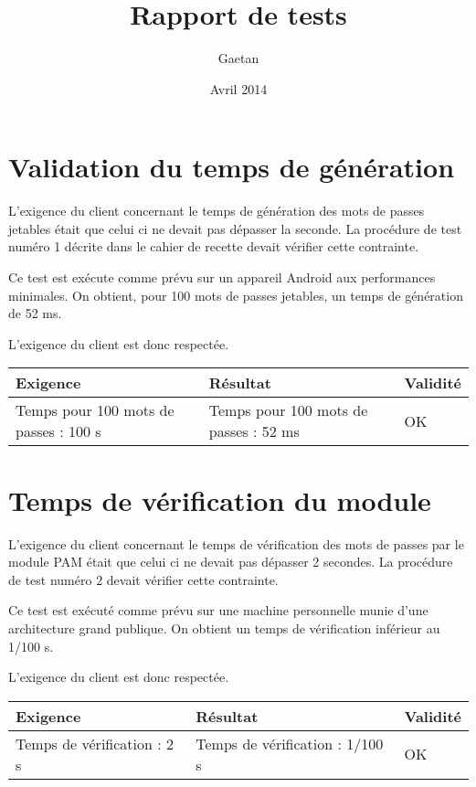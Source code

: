 \documentclass{"../../res/univ-projet"}
\title{Rapport de tests}
\author{\bsc{Ferry} Gaetan}
\date{Avril 2014}
\begin{document}
  \maketitle
  
	\section{Validation du temps de génération}
	L'exigence du client concernant le temps de génération des mots de passes
	jetables était que celui ci ne devait pas dépasser la seconde.
	La procédure de test numéro 1 décrite dans le cahier de recette devait
	vérifier cette contrainte.
	
	Ce test est exécute comme prévu sur un appareil Android aux performances
	minimales. On obtient, pour 100 mots de passes jetables, un temps de
	génération de 52 ms.
	
	L'exigence du client est donc respectée.
	\begin{center}	
		\begin{tabular}{| p{6cm} | p{6cm} | p{2cm} |}
			\hline
			\cellcolor{lightgray} Exigence & \cellcolor{lightgray} Résultat & 
			\cellcolor{lightgray} Validité \\ \hline
		
			Temps pour 100 mots de passes : 100 s & Temps pour 100 mots de passes : 52 ms & 
			\cellcolor{green} OK \\ \hline
		\end{tabular}
	\end{center}
	
  
	\section{Temps de vérification du module}  
    L'exigence du client concernant le temps de vérification des mots de passes par le
    module PAM était que celui ci ne devait pas dépasser 2 secondes. La procédure de test
    numéro 2 devait vérifier cette contrainte.
    
    Ce test est exécuté comme prévu sur une machine personnelle munie d'une architecture
    grand publique. On obtient un temps de vérification inférieur au 1/100 s.
    
    L'exigence du client est donc respectée.
	\begin{center}	
		\begin{tabular}{| p{6cm} | p{6cm} | p{2cm} |}
			\hline
			\cellcolor{lightgray} Exigence & \cellcolor{lightgray} Résultat & 
			\cellcolor{lightgray} Validité \\ \hline
		
			Temps de vérification : 2 s & Temps de vérification : 1/100 s & 
			\cellcolor{green} OK \\ \hline
		\end{tabular}
	\end{center}
    
\end{document}

